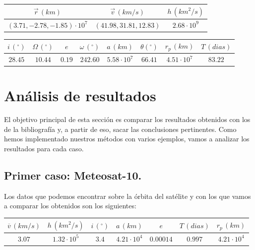 \documentclass{article}
\numberwithin{equation}{section}
\begin{document}
\begin{center}
    \centering
    \begin{tabular}{|c|c|c|}
    \hline
    $\overrightarrow{r}\, (km)$ & $\overrightarrow{v}\, (km/s)$ & $h\, ( km^{2}/s)$  \\ \hline
    $(3.71, -2.78, -1.85)\cdot10^7$ & $(41.98, 31.81, 12.83)$ & $2.68 \cdot 10^{9}$\\ \hline
    \end{tabular}
\end{center}

\begin{center}
    \centering
    \begin{tabular}{|c|c|c|c|c|c|c|c|}
    \hline
     $i\, (^{\circ})$ & $\Omega\, (^\circ)$ & $e$ & $\omega\, (^\circ)$ & $a\, (km)$ & $\theta (^\circ)$ & $r_{p}\, (km)$ & $T\, (dias)$\\ \hline
    $28.45$ & $10.44$ & $0.19$ & $242.60$ & $5.58\cdot 10^{7}$ & $66.41$ & $4.51\cdot 10^{7}$ & $83.22$ \\ \hline
    \end{tabular}
\end{center}


\section{Análisis de resultados} %
El objetivo principal de esta sección es comparar los resultados obtenidos con los de la bibliografía y, a partir de eso, sacar las conclusiones pertinentes. Como hemos implementado nuestros métodos con varios ejemplos, vamos a analizar los resultados para cada caso.\par

\subsection{Primer caso: Meteosat-10.}

Los datos que podemos encontrar sobre la órbita del satélite y con los que vamos a comparar los obtenidos son los siguientes:

\begin{center}
    \centering
    \begin{tabular}{|c|c|c|c|c|c|c|}
    \hline
    $\overline{v}\, (km/s)$ & $h\, (km^{2}/s)$ & $i\, (^{\circ})$ & $a\, (km)$ & $e$ & $T\, (dias)$ & $r_{p}\, (km)$\\ \hline
    $3.07$ & $1.32 \cdot 10^{5}$ & $3.4$ & $4.21\cdot 10^{4}$ & $0.00014$ & $0.997$ & $4.21\cdot10^4$\\ \hline
    \end{tabular}
\end{center}
\end{document}
